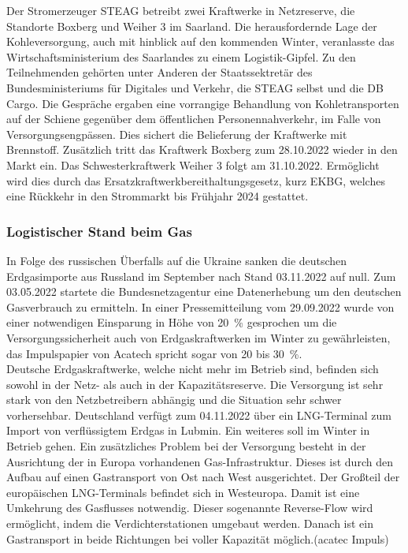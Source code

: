 		Der Stromerzeuger STEAG betreibt zwei Kraftwerke in Netzreserve, die Standorte Boxberg und Weiher 3 im Saarland. Die herausfordernde Lage der Kohleversorgung, auch mit hinblick auf den kommenden Winter, veranlasste das Wirtschaftsministerium des Saarlandes zu einem Logistik-Gipfel. Zu den Teilnehmenden gehörten unter Anderen der Staatssektretär des Bundesministeriums für Digitales und Verkehr, die STEAG selbst und die DB Cargo. Die Gespräche ergaben eine vorrangige Behandlung von Kohletransporten auf der Schiene gegenüber dem öffentlichen Personennahverkehr, im Falle von Versorgungsengpässen. Dies sichert die Belieferung der Kraftwerke mit Brennstoff. Zusätzlich tritt das Kraftwerk Boxberg zum 28.10.2022 wieder in den Markt ein. Das Schwesterkraftwerk Weiher 3 folgt am 31.10.2022. Ermöglicht wird dies durch das Ersatzkraftwerkbereithaltungsgesetz, kurz EKBG, welches eine Rückkehr in den Strommarkt bis Frühjahr 2024 gestattet.\\
		
		
		\subsubsection{Logistischer Stand beim Gas}
		In Folge des russischen Überfalls auf die Ukraine sanken die deutschen Erdgasimporte aus Russland im September nach Stand 03.11.2022 auf null. Zum 03.05.2022 startete die Bundesnetzagentur eine Datenerhebung um den deutschen Gasverbrauch zu ermitteln. In einer Pressemitteilung vom 29.09.2022 wurde von einer notwendigen Einsparung in Höhe von \SI{20}{\percent} gesprochen um die Versorgungssicherheit auch von Erdgaskraftwerken im Winter zu gewährleisten, das Impulspapier von Acatech spricht sogar von 20 bis \SI{30}{\percent}.\\
		
		Deutsche Erdgaskraftwerke, welche nicht mehr im Betrieb sind, befinden sich sowohl in der Netz- als auch in der Kapazitätsreserve. Die Versorgung ist sehr stark von den Netzbetreibern abhängig und die Situation sehr schwer vorhersehbar. Deutschland verfügt zum 04.11.2022 über ein LNG-Terminal zum Import von verflüssigtem Erdgas in Lubmin. Ein weiteres soll im Winter in Betrieb gehen.
		Ein zusätzliches Problem bei der Versorgung besteht in der Ausrichtung der in Europa vorhandenen Gas-Infrastruktur. Dieses ist durch den Aufbau auf einen Gastransport von Ost nach West ausgerichtet. Der Großteil der europäischen LNG-Terminals befindet sich in Westeuropa. Damit ist eine Umkehrung des Gasflusses notwendig. Dieser sogenannte Reverse-Flow wird ermöglicht, indem die Verdichterstationen umgebaut werden. Danach ist ein Gastransport in beide Richtungen bei voller Kapazität möglich.(acatec Impuls)\\
		
